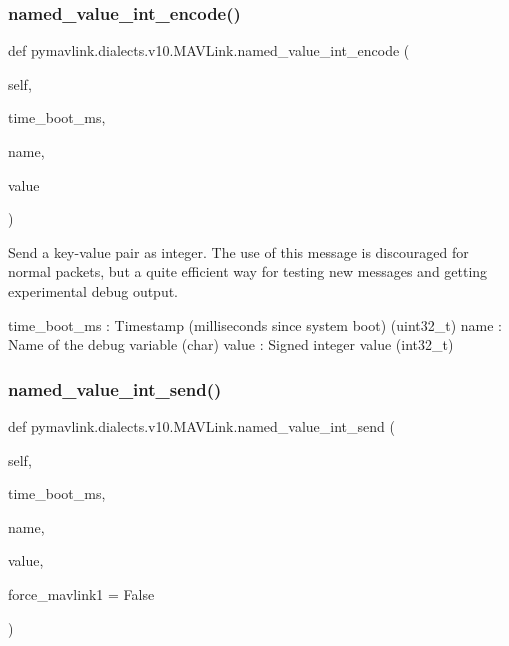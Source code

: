 \begin{DoxyVerb}
\begin{DoxyVerb}
\begin{DoxyVerb}
\begin{DoxyVerb}
\subsubsection{\texorpdfstring{named\+\_\+value\+\_\+int\+\_\+encode()}{named\_value\_int\_encode()}}
{\footnotesize\ttfamily def pymavlink.\+dialects.\+v10.\+M\+A\+V\+Link.\+named\+\_\+value\+\_\+int\+\_\+encode (\begin{DoxyParamCaption}\item[{}]{self,  }\item[{}]{time\+\_\+boot\+\_\+ms,  }\item[{}]{name,  }\item[{}]{value }\end{DoxyParamCaption})}

\begin{DoxyVerb}Send a key-value pair as integer. The use of this message is
discouraged for normal packets, but a quite efficient
way for testing new messages and getting experimental
debug output.

time_boot_ms              : Timestamp (milliseconds since system boot) (uint32_t)
name                      : Name of the debug variable (char)
value                     : Signed integer value (int32_t)\end{DoxyVerb}
 \mbox{\label{classpymavlink_1_1dialects_1_1v10_1_1MAVLink_ad73c59270b095cd4694efaa806614947}} 
\subsubsection{\texorpdfstring{named\+\_\+value\+\_\+int\+\_\+send()}{named\_value\_int\_send()}}
{\footnotesize\ttfamily def pymavlink.\+dialects.\+v10.\+M\+A\+V\+Link.\+named\+\_\+value\+\_\+int\+\_\+send (\begin{DoxyParamCaption}\item[{}]{self,  }\item[{}]{time\+\_\+boot\+\_\+ms,  }\item[{}]{name,  }\item[{}]{value,  }\item[{}]{force\+\_\+mavlink1 = {\ttfamily False} }\end{DoxyParamCaption})}


\end{DoxyVerb}
\end{DoxyVerb}
\end{DoxyVerb}
\end{DoxyVerb}
